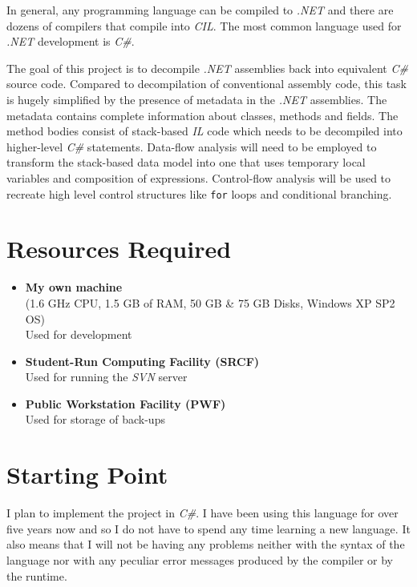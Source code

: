 \documentclass[12pt]{article}
\begin{document}
In general, any programming language can be compiled to \emph{.NET} and 
there are dozens of compilers that compile into \emph{CIL}.  The most 
common language used for \emph{.NET} development is \emph{C\#}.

The goal of this project is to decompile \emph{.NET} assemblies back into 
equivalent \emph{C\#} source code.  Compared to decompilation of 
conventional assembly code, this task is hugely simplified by the 
presence of metadata in the \emph{.NET} assemblies.  The metadata contains 
complete information about classes, methods and fields.  The method bodies 
consist of stack-based \emph{IL} code which needs to be decompiled into 
higher-level \emph{C\#} statements.  Data-flow analysis will need to be 
employed to transform the stack-based data model into one that uses 
temporary local variables and composition of expressions.  Control-flow 
analysis will be used to recreate high level control structures like 
\verb|for| loops and conditional branching.

\section*{Resources Required}
\begin{itemize}
	\item{\textbf{My own machine}\\
		(1.6 GHz CPU, 1.5 GB of RAM, 50 GB \& 75 GB Disks, 
		Windows XP SP2 OS) \\
		Used for development
	}
	\item{\textbf{Student-Run Computing Facility (SRCF)}\\
		Used for running the \emph{SVN} server
	}
	\item{\textbf{Public Workstation Facility (PWF)}\\
		Used for storage of back-ups
	}
\end{itemize}

\newpage

\section*{Starting Point}
I plan to implement the project in \emph{C\#}.  I have been using this 
language for over five years now and so I do not have to spend any time 
learning a new language.  It also means that I will not be having any 
problems neither with the syntax of the language nor with any peculiar 
error messages produced by the compiler or by the runtime.
\end{document}
